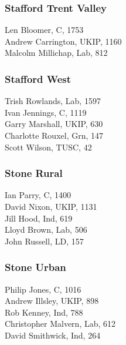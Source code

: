 \documentclass[a4paper,openany,10pt]{book}
\begin{document}
\subsubsection*{Stafford Trent Valley}



Len Bloomer, C, 1753\\
Andrew Carrington, UKIP, 1160\\
Malcolm Millichap, Lab, 812\\


\subsubsection*{Stafford West}



Trish Rowlands, Lab, 1597\\
Ivan Jennings, C, 1119\\
Garry Marshall, UKIP, 630\\
Charlotte Rouxel, Grn, 147\\
Scott Wilson, TUSC, 42\\


\subsubsection*{Stone Rural}



Ian Parry, C, 1400\\
David Nixon, UKIP, 1131\\
Jill Hood, Ind, 619\\
Lloyd Brown, Lab, 506\\
John Russell, LD, 157\\


\subsubsection*{Stone Urban}



Philip Jones, C, 1016\\
Andrew Illsley, UKIP, 898\\
Rob Kenney, Ind, 788\\
Christopher Malvern, Lab, 612\\
David Smithwick, Ind, 264\\
\end{document}
